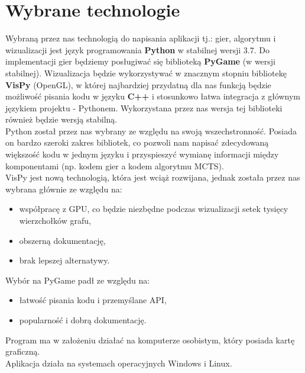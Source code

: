 \documentclass{article}
\let\oldsection\section
\renewcommand\section{\clearpage\oldsection}
\begin{document}
	\section{Wybrane technologie}
	Wybraną przez nas technologią do napisania aplikacji tj.: gier, algorytmu i wizualizacji jest język programowania \textbf{Python} w stabilnej wersji 3.7. Do implementacji gier będziemy posługiwać się biblioteką \textbf{PyGame} (w wersji stabilnej). Wizualizacja będzie wykorzystywać w znacznym stopniu bibliotekę \textbf{VisPy} (OpenGL), w której najbardziej przydatną dla nas funkcją będzie możliwość pisania kodu w języku \textbf{C++} i stosunkowo łatwa integracja z głównym językiem projektu - Pythonem. Wykorzystana przez nas wersja tej biblioteki również będzie wersją stabilną.\\
	
	\noindent Python został przez nas wybrany ze względu na swoją wszechstronność. Posiada on bardzo szeroki zakres bibliotek, co pozwoli nam napisać zdecydowaną większość kodu w jednym języku i przyspieszyć wymianę informacji między komponentami (np. kodem gier a kodem algorytmu MCTS).\\
	
	\noindent VisPy jest nową technologią, która jest wciąż rozwijana, jednak została przez nas wybrana głównie ze względu na:
	\begin{itemize}
		\item współpracę z GPU, co będzie niezbędne podczas wizualizacji setek tysięcy wierzchołków grafu,
		\item obszerną dokumentację,
		\item brak lepszej alternatywy.\\
	\end{itemize}
	Wybór na PyGame padł ze względu na:
	\begin{itemize}
		\item łatwość pisania kodu i przemyślane API,
		\item popularność i dobrą dokumentację.\\
	\end{itemize}
	Program ma w założeniu działać na komputerze osobistym, który posiada kartę graficzną.\\
	Aplikacja działa na systemach operacyjnych Windows i Linux.
	
\end{document}

